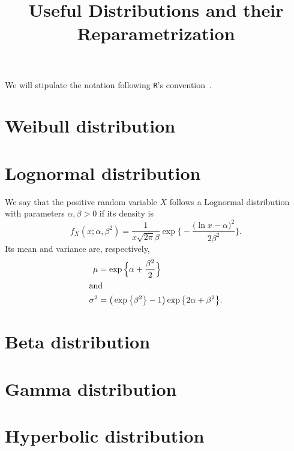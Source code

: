 \documentclass[12pt]{article}
\title{Useful Distributions and their Reparametrization}
\author{}
\date{}
\begin{document}
\maketitle

We will stipulate the notation following \texttt R's convention~\citep{RManual}.

\section{Weibull distribution}

\section{Lognormal distribution}

We say that the positive random variable $X$ follows a Lognormal distribution with parameters $\alpha,\beta>0$ if its density is
\begin{equation}
f_X(x;\alpha,\beta^2) = \frac{1}{x\sqrt{2\pi}\beta} \exp\Big\{
-\frac{\big(\ln x - \alpha\big)^2}{2 \beta^2}
\Big\}.
\label{Eq:DensLogNormal}
\end{equation}
Its mean and variance are, respectively,
\begin{align}
	\mu & = \exp\Big\{\alpha+\frac{\beta^2}{2}\Big\}\label{Eq:MeanLogNormal}\\
\intertext{and}
	\sigma^2 & = \big(\exp\big\{\beta^2\big\}-1\big) \exp\big\{2\alpha+\beta^2\big\}. \label{Eq:VarianceLogNormal}
\end{align}
\section{Beta distribution}

\section{Gamma distribution}

\section{Hyperbolic distribution}
\end{document}
